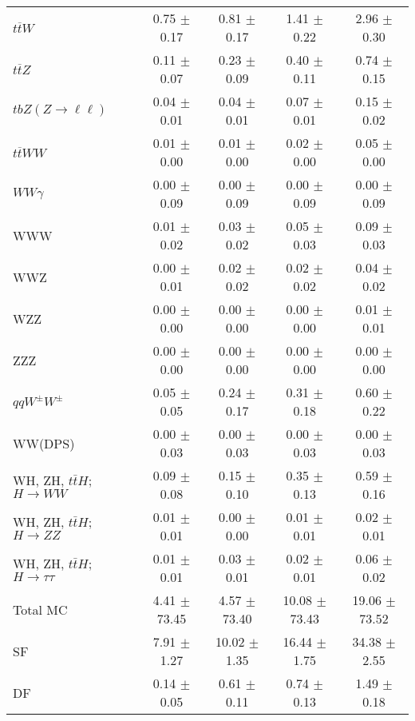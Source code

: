 \begin{tabular}{l|cccc}
                   $t\overline{t}W$ &  0.75 $\pm$  0.17 &  0.81 $\pm$  0.17 &  1.41 $\pm$  0.22 &  2.96 $\pm$  0.30 \\
                   $t\overline{t}Z$ &  0.11 $\pm$  0.07 &  0.23 $\pm$  0.09 &  0.40 $\pm$  0.11 &  0.74 $\pm$  0.15 \\
    $tbZ (Z \rightarrow \ell \ell)$ &  0.04 $\pm$  0.01 &  0.04 $\pm$  0.01 &  0.07 $\pm$  0.01 &  0.15 $\pm$  0.02 \\
                  $t\overline{t}WW$ &  0.01 $\pm$  0.00 &  0.01 $\pm$  0.00 &  0.02 $\pm$  0.00 &  0.05 $\pm$  0.00 \\
                         $WW\gamma$ &  0.00 $\pm$  0.09 &  0.00 $\pm$  0.09 &  0.00 $\pm$  0.09 &  0.00 $\pm$  0.09 \\
                                WWW &  0.01 $\pm$  0.02 &  0.03 $\pm$  0.02 &  0.05 $\pm$  0.03 &  0.09 $\pm$  0.03 \\
                                WWZ &  0.00 $\pm$  0.01 &  0.02 $\pm$  0.02 &  0.02 $\pm$  0.02 &  0.04 $\pm$  0.02 \\
                                WZZ &  0.00 $\pm$  0.00 &  0.00 $\pm$  0.00 &  0.00 $\pm$  0.00 &  0.01 $\pm$  0.01 \\
                                ZZZ &  0.00 $\pm$  0.00 &  0.00 $\pm$  0.00 &  0.00 $\pm$  0.00 &  0.00 $\pm$  0.00 \\
                 $qqW^{\pm}W^{\pm}$ &  0.05 $\pm$  0.05 &  0.24 $\pm$  0.17 &  0.31 $\pm$  0.18 &  0.60 $\pm$  0.22 \\
                            WW(DPS) &  0.00 $\pm$  0.03 &  0.00 $\pm$  0.03 &  0.00 $\pm$  0.03 &  0.00 $\pm$  0.03 \\
WH, ZH, $t\bar{t}H$; $H \rightarrow WW$ &  0.09 $\pm$  0.08 &  0.15 $\pm$  0.10 &  0.35 $\pm$  0.13 &  0.59 $\pm$  0.16 \\
WH, ZH, $t\bar{t}H$; $H \rightarrow ZZ$ &  0.01 $\pm$  0.01 &  0.00 $\pm$  0.00 &  0.01 $\pm$  0.01 &  0.02 $\pm$  0.01 \\
WH, ZH, $t\bar{t}H$; $H \rightarrow \tau\tau$ &  0.01 $\pm$  0.01 &  0.03 $\pm$  0.01 &  0.02 $\pm$  0.01 &  0.06 $\pm$  0.02 \\
\hline\hline
                           Total MC &  4.41 $\pm$ 73.45 &  4.57 $\pm$ 73.40 & 10.08 $\pm$ 73.43 & 19.06 $\pm$ 73.52 \\
\hline
                                 SF &  7.91 $\pm$  1.27 & 10.02 $\pm$  1.35 & 16.44 $\pm$  1.75 & 34.38 $\pm$  2.55 \\
                                 DF &  0.14 $\pm$  0.05 &  0.61 $\pm$  0.11 &  0.74 $\pm$  0.13 &  1.49 $\pm$  0.18 \\

\end{tabular}
